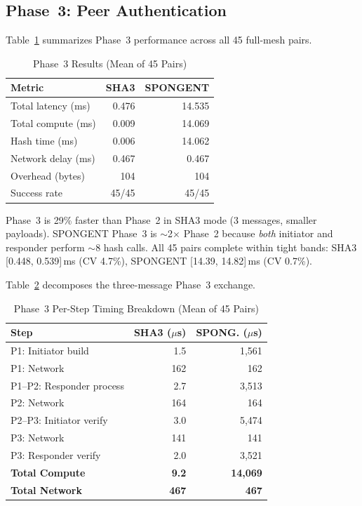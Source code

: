 \documentclass[conference]{IEEEtran}
\begin{document}
\subsection{Phase~3: Peer Authentication}

Table~\ref{tab:phase3} summarizes Phase~3 performance across all 45 full-mesh pairs.

\begin{table}[H]
\centering
\caption{Phase~3 Results (Mean of 45 Pairs)}
\label{tab:phase3}
\footnotesize
\begin{tabular}{@{}lrr@{}}
\toprule
\textbf{Metric} & \textbf{SHA3} & \textbf{SPONGENT} \\
\midrule
Total latency (ms) & 0.476 & 14.535 \\
Total compute (ms) & 0.009 & 14.069 \\
Hash time (ms) & 0.006 & 14.062 \\
Network delay (ms) & 0.467 & 0.467 \\
Overhead (bytes) & 104 & 104 \\
Success rate & 45/45 & 45/45 \\
\bottomrule
\end{tabular}
\end{table}

Phase~3 is 29\% faster than Phase~2 in SHA3 mode (3 messages, smaller payloads). SPONGENT Phase~3 is $\sim$2$\times$ Phase~2 because \emph{both} initiator and responder perform $\sim$8 hash calls. All 45 pairs complete within tight bands: SHA3 [0.448, 0.539]\,ms (CV 4.7\%), SPONGENT [14.39, 14.82]\,ms (CV 0.7\%).

Table~\ref{tab:phase3_breakdown} decomposes the three-message Phase~3 exchange.

\begin{table}[H]
\centering
\caption{Phase~3 Per-Step Timing Breakdown (Mean of 45 Pairs)}
\label{tab:phase3_breakdown}
\footnotesize
\begin{tabular}{@{}lrr@{}}
\toprule
\textbf{Step} & \textbf{SHA3 ($\mu$s)} & \textbf{SPONG. ($\mu$s)} \\
\midrule
P1: Initiator build & 1.5 & 1,561 \\
P1: Network & 162 & 162 \\
P1--P2: Responder process & 2.7 & 3,513 \\
P2: Network & 164 & 164 \\
P2--P3: Initiator verify & 3.0 & 5,474 \\
P3: Network & 141 & 141 \\
P3: Responder verify & 2.0 & 3,521 \\
\midrule
\textbf{Total Compute} & \textbf{9.2} & \textbf{14,069} \\
\textbf{Total Network} & \textbf{467} & \textbf{467} \\
\bottomrule
\end{tabular}
\end{table}
\end{document}

